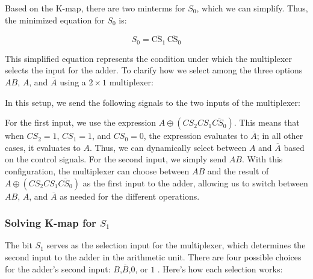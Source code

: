 \documentclass{article}
\begin{document}
Based on the K-map, there are two minterms for $S_0$, which we can simplify. Thus, the minimized equation for $S_0$ is:

\begin{center}
    $$
        S_0 = \overline{\text{CS}_1} \, \overline{\text{CS}_0}
    $$
\end{center}
This simplified equation represents the condition under which the multiplexer selects the input for the adder. To clarify how we select among the three options $AB$, $A$, and $\overline{A}$ using a $2 \times 1$ multiplexer:

In this setup, we send the following signals to the two inputs of the multiplexer:

For the first input, we use the expression $A \oplus ({CS}_2 {CS}_1 \overline{{CS}_0})$. This means that when ${CS}_2 = 1$, ${CS}_1 = 1$, and ${CS}_0 = 0$, the expression evaluates to $\overline{A}$; in all other cases, it evaluates to $A$. Thus, we can dynamically select between $A$ and $\overline{A}$ based on the control signals.
For the second input, we simply send $AB$.
With this configuration, the multiplexer can choose between $AB$ and the result of $A \oplus ({CS}_2 {CS}_1 \overline{{CS}_0})$ as the first input to the adder, allowing us to switch between $AB$, $A$, and $\overline{A}$ as needed for the different operations.

\subsubsection{Solving K-map for $S_1$}
The bit $S_1$ serves as the selection input for the multiplexer, which determines the second input to the adder in the arithmetic unit. There are four possible choices for the adder’s second input: $B$,$\overline{B}$,$0$, or $1$ . Here’s how each selection works:
\end{document}
